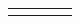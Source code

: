 \begin{longtable}{ C{4cm} | L{4cm}| L{4cm}| L{4cm} }
	&                                                                    &                                                         &                                                                                                                                                                   \\ \hline
	&                                                                    &                                                         &                                                                                                                                                                   \\ \hline
\end{longtable}




